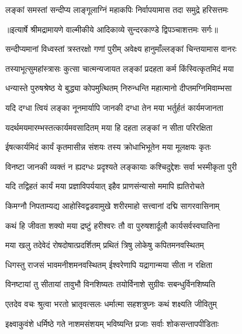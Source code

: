\twolineshloka
{लङ्कां समस्तां सन्दीप्य लाङ्गूलाग्निं महाकपिः}
{निर्वापयामास तदा समुद्रे हरिसत्तमः} %


{॥इत्यार्षे श्रीमद्रामायणे वाल्मीकीये आदिकाव्ये सुन्दरकाण्डे द्विपञ्चाशत्तमः सर्गः॥}


\twolineshloka
{सन्दीप्यमानां विध्वस्तां त्रस्तरक्षो गणां पुरीम्}
{अवेक्ष्य हानुमाँल्लङ्कां चिन्तयामास वानरः} %

\twolineshloka
{तस्याभूत्सुमहांस्त्रासः कुत्सा चात्मन्यजायत}
{लङ्कां प्रदहता कर्म किंस्वित्कृतमिदं मया} %

\twolineshloka
{धन्यास्ते पुरुषश्रेष्ठ ये बुद्ध्या कोपमुत्थितम्}
{निरुन्धन्ति महात्मानो दीप्तमग्निमिवाम्भसा} %

\twolineshloka
{यदि दग्धा त्वियं लङ्का नूनमार्यापि जानकी}
{दग्धा तेन मया भर्तुर्हतं कार्यमजानता} %

\twolineshloka
{यदर्थमयमारम्भस्तत्कार्यमवसादितम्}
{मया हि दहता लङ्कां न सीता परिरक्षिता} %

\twolineshloka
{ईषत्कार्यमिदं कार्यं कृतमासीन्न संशयः}
{तस्य क्रोधाभिभूतेन मया मूलक्षयः कृतः} %

\twolineshloka
{विनष्टा जानकी व्यक्तं न ह्यदग्धः प्रदृश्यते}
{लङ्कायाः कश्चिदुद्देशः सर्वा भस्मीकृता पुरी} %

\twolineshloka
{यदि तद्विहतं कार्यं मया प्रज्ञाविपर्ययात्}
{इहैव प्राणसंन्यासो ममापि ह्यतिरोचते} %

\twolineshloka
{किमग्नौ निपताम्यद्य आहोस्विद्वडवामुखे}
{शरीरमाहो सत्त्वानां दद्मि सागरवासिनाम्} %

\twolineshloka
{कथं हि जीवता शक्यो मया द्रष्टुं हरीश्वरः}
{तौ वा पुरुषशार्दूलौ कार्यसर्वस्वघातिना} %

\twolineshloka
{मया खलु तदेवेदं रोषदोषात्प्रदर्शितम्}
{प्रथितं त्रिषु लोकेषु कपितमनवस्थितम्} %

\twolineshloka
{धिगस्तु राजसं भावमनीशमनवस्थितम्}
{ईश्वरेणापि यद्रागान्मया सीता न रक्षिता} %

\twolineshloka
{विनष्टायां तु सीतायां तावुभौ विनशिष्यतः}
{तयोर्विनाशे सुग्रीवः सबन्धुर्विनशिष्यति} %

\twolineshloka
{एतदेव वचः श्रुत्वा भरतो भ्रातृवत्सलः}
{धर्मात्मा सहशत्रुघ्नः कथं शक्ष्यति जीवितुम्} %

\twolineshloka
{इक्ष्वाकुवंशे धर्मिष्ठे गते नाशमसंशयम्}
{भविष्यन्ति प्रजाः सर्वाः शोकसन्तापपीडिताः} %

